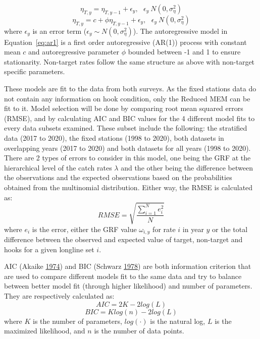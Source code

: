 \documentclass[12pt]{article}\usepackage[]{graphicx}\usepackage[]{color}
\begin{document}
\begin{equation}\label{eq:rand-walk}
\eta_{T,y} = \eta_{T,y-1} + \epsilon_y, \ \ \ \epsilon_y ~ N(0,\sigma_\eta^2)
\end{equation} \begin{equation}\label{eq:ar1}
\eta_{T,y} = c + \phi \eta_{T,y-1} + \epsilon_y, \ \ \ \epsilon_y ~ N(0,\sigma_\eta^2)
\end{equation}
where \(\epsilon_y\) is an error term (\(\epsilon_y \sim N(0,\sigma_\eta^2)\)). The autoregressive model in Equation~\ref{eq:ar1} is a first order autoregressive (AR(1)) process with constant mean \(c\) and autoregressive parameter \(\phi\) bounded between -1 and 1 to ensure stationarity. Non-target rates follow the same structure as above with non-target specific parameters.

These models are fit to the data from both surveys. As the fixed stations data do not contain any information on hook condition, only the Reduced MEM can be fit to it. Model selection will be done by comparing root mean squared errors (RMSE), and by calculating AIC and BIC values for the 4 different model fits to every data subsets examined. These subset include the following: the stratified data (2017 to 2020), the fixed stations (1998 to 2020), both datasets in overlapping years (2017 to 2020) and both datasets for all years (1998 to 2020). There are 2 types of errors to consider in this model, one being the GRF at the hierarchical level of the catch rates \(\lambda\) and the other being the difference between the observations and the expected observations based on the probabilities obtained from the multinomial distribution. Either way, the RMSE is calculated as:
\begin{equation}
RMSE = \sqrt{\frac{\sum_{i=1}^N e_i^2}{N}}
\end{equation}
where \(e_i\) is the error, either the GRF value \(\omega_{i,y}\) for rate \(i\) in year \(y\) or the total difference between the observed and expected value of target, non-target and hooks for a given longline set \(i\).

AIC (Akaike \protect\hyperlink{ref-Akaike1974}{1974}) and BIC (Schwarz \protect\hyperlink{ref-Schwarz1978}{1978}) are both information criterion that are used to compare different models fit to the same data and try to balance between better model fit (through higher likelihood) and number of parameters. They are respectively calculated as:
\begin{equation}\label{eq:aic}
AIC = 2K - 2 log(L)
\end{equation} \begin{equation}\label{eq:bic}
BIC = K log(n) - 2 log(L)
\end{equation}
where \(K\) is the number of parameters, \(log(\cdot)\) is the natural log, \(L\) is the maximized likelihood, and \(n\) is the number of data points.
\end{document}

